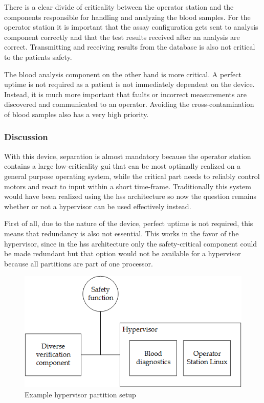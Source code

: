There is a clear divide of criticality between the operator station and the components responsible for handling and analyzing the blood samples. For the operator station it is important that the assay configuration gets sent to analysis component correctly and that the test results received after an analysis are correct. Transmitting and receiving results from the database is also not critical to the patients safety.

The blood analysis component on the other hand is more critical. A perfect uptime is not required as a patient is not immediately dependent on the device. Instead, it is much more important that faults or incorrect measurements are discovered and communicated to an operator. Avoiding the cross-contamination of blood samples also has a very high priority.

\subsubsection{Discussion}
With this device, separation is almost mandatory because the operator station contains a large low-criticality \acrshort{gui} that can be most optimally realized on a general purpose operating system, while the critical part needs to reliably control motors and react to input within a short time-frame. Traditionally this system would have been realized using the \acrshort{hss} architecture so now the question remains whether or not a hypervisor can be used effectively instead.

First of all, due to the nature of the device, perfect uptime is not required, this means that redundancy is also not essential. This works in the favor of the hypervisor, since in the \acrshort{hss} architecture only the safety-critical component could be made redundant but that option would not be available for a hypervisor because all partitions are part of one processor. 

\begin{figure}
\centering
\includegraphics[scale=0.75]{Figures/blood_diagnostics_arch}
\decoRule
\caption{Example hypervisor partition setup}
\label{fig:blood_diagnostics_hv_arch}
\end{figure}

